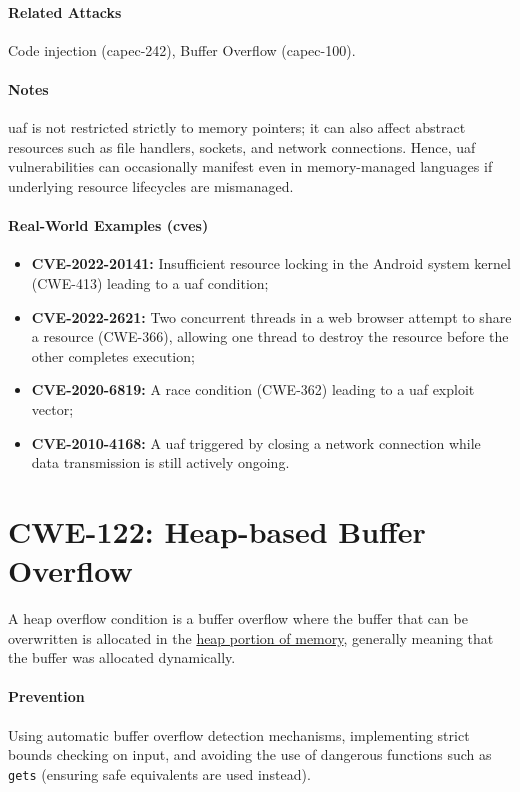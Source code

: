 \paragraph{Related Attacks} Code injection (\gls{capec}-242), Buffer Overflow (\gls{capec}-100).

\paragraph{Notes} \gls{uaf} is not restricted strictly to memory pointers; it can also affect abstract resources such as file handlers, sockets, and network connections. Hence, \gls{uaf} vulnerabilities can occasionally manifest even in memory-managed languages if underlying resource lifecycles are mismanaged.

\paragraph{Real-World Examples (\glspl{cve})}
\begin{itemize}
    \item \textbf{CVE-2022-20141:} Insufficient resource locking in the Android system kernel (CWE-413) leading to a \gls{uaf} condition;
    \item \textbf{CVE-2022-2621:} Two concurrent threads in a web browser attempt to share a resource (CWE-366), allowing one thread to destroy the resource before the other completes execution;
    \item \textbf{CVE-2020-6819:} A race condition (CWE-362) leading to a \gls{uaf} exploit vector;
    \item \textbf{CVE-2010-4168:} A \gls{uaf} triggered by closing a network connection while data transmission is still actively ongoing.
\end{itemize}

\section{CWE-122: Heap-based Buffer Overflow}
A heap overflow condition is a buffer overflow where the buffer that can be overwritten is allocated in the \underline{heap portion of memory}, generally meaning that the buffer was allocated dynamically.

\paragraph{Prevention} Using automatic buffer overflow detection mechanisms, implementing strict bounds checking on input, and avoiding the use of dangerous functions such as \texttt{gets} (ensuring safe equivalents are used instead).

